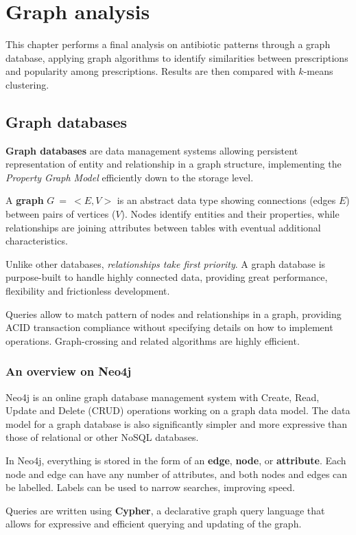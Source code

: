 \chapter{Graph analysis}
This chapter performs a final analysis on antibiotic patterns through a graph database, applying graph algorithms to identify similarities between prescriptions and popularity among prescriptions. Results are then compared with $k$-means clustering.

\section{Graph databases}
\textbf{Graph databases} are data management systems allowing persistent representation of entity and relationship in a graph structure, implementing the \textit{Property Graph Model} efficiently down to the storage level.

A \textbf{graph} $G\: =\: <E, V>$ is an abstract data type showing connections (edges $E$) between pairs of vertices ($V$). Nodes identify entities and their properties, while relationships are joining attributes between tables with eventual additional characteristics. 

Unlike other databases, \textit{relationships take first priority}. A graph database is purpose-built to handle highly connected data, providing great performance, flexibility and frictionless development.

Queries allow to match pattern of nodes and relationships in a graph, providing ACID transaction compliance without specifying details on how to implement operations. Graph-crossing and related algorithms are highly efficient.

\subsection{An overview on Neo4j}
Neo4j is an online graph database management system with Create, Read, Update and Delete (CRUD) operations working on a graph data model. The data model for a graph database is also significantly simpler and more expressive than those of relational or other NoSQL databases.

In Neo4j, everything is stored in the form of an \textbf{edge}, \textbf{node}, or \textbf{attribute}. Each node and edge can have any number of attributes, and both nodes and edges can be labelled. Labels can be used to narrow searches, improving speed.

Queries are written using \textbf{Cypher}, a declarative graph query language that allows for expressive and efficient querying and updating of the graph. 

